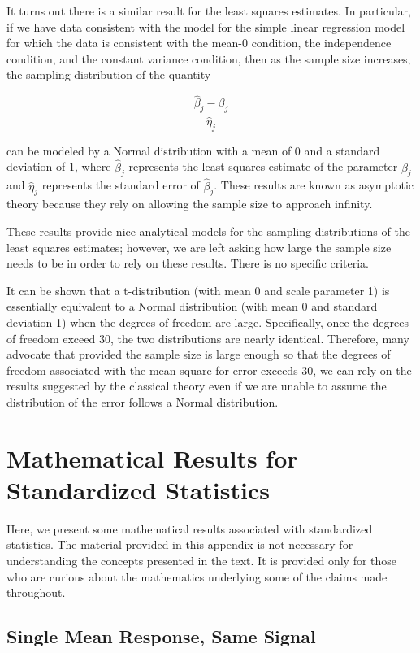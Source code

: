 \documentclass[
  letterpaper,
  DIV=11,
  numbers=noendperiod]{scrreprt}
\theoremstyle{definition}
\theoremstyle{definition}
\theoremstyle{plain}
\theoremstyle{remark}
\begin{document}
It turns out there is a similar result for the least squares estimates.
In particular, if we have data consistent with the model for the simple
linear regression model for which the data is consistent with the mean-0
condition, the independence condition, and the constant variance
condition, then as the sample size increases, the sampling distribution
of the quantity

\[\frac{\widehat{\beta}_j - \beta_j}{\widehat{\eta}_j}\]

can be modeled by a Normal distribution with a mean of 0 and a standard
deviation of 1, where \(\widehat{\beta}_j\) represents the least squares
estimate of the parameter \(\beta_j\) and \(\widehat{\eta}_j\)
represents the standard error of \(\widehat{\beta}_j\). These results
are known as asymptotic theory because they rely on allowing the sample
size to approach infinity.

These results provide nice analytical models for the sampling
distributions of the least squares estimates; however, we are left
asking how large the sample size needs to be in order to rely on these
results. There is no specific criteria.

It can be shown that a t-distribution (with mean 0 and scale parameter
1) is essentially equivalent to a Normal distribution (with mean 0 and
standard deviation 1) when the degrees of freedom are large.
Specifically, once the degrees of freedom exceed 30, the two
distributions are nearly identical. Therefore, many advocate that
provided the sample size is large enough so that the degrees of freedom
associated with the mean square for error exceeds 30, we can rely on the
results suggested by the classical theory even if we are unable to
assume the distribution of the error follows a Normal distribution.

\chapter{Mathematical Results for Standardized
Statistics}\label{sec-app-teststat}

Here, we present some mathematical results associated with standardized
statistics. The material provided in this appendix is not necessary for
understanding the concepts presented in the text. It is provided only
for those who are curious about the mathematics underlying some of the
claims made throughout.

\section{Single Mean Response, Same
Signal}\label{single-mean-response-same-signal}
\end{document}
